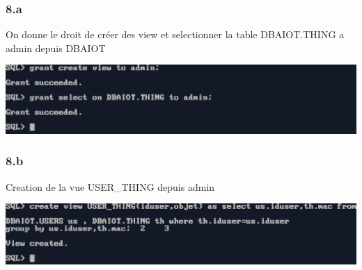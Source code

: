 \subsubsection*{8.a}
On donne le droit de créer des view et selectionner la table DBAIOT.THING a admin depuis DBAIOT



\begin{center}
    \includegraphics[width=\textwidth]{ScreenShot/Partie4/grant2.png}
\end{center}

\subsubsection*{8.b}
Creation de la vue USER\_THING depuis admin



\begin{center}
    \includegraphics[width=\textwidth]{ScreenShot/Partie4/createView1.png}
\end{center}


